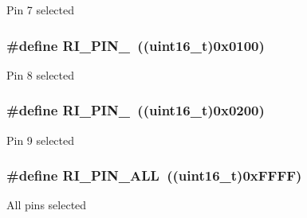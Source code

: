 Pin 7 selected \hypertarget{group___r_i___pin_gae80b308782b3bf8dc7c7ca756cd26493}{
\subsubsection[{R\-I\-\_\-\-P\-I\-N\-\_\-8}]{\setlength{\rightskip}{0pt plus 5cm}\#define R\-I\-\_\-\-P\-I\-N\-\_~((uint16\-\_\-t)0x0100)}}\label{group___r_i___pin_gae80b308782b3bf8dc7c7ca756cd26493}
Pin 8 selected \hypertarget{group___r_i___pin_ga1e3cdb6c6e8aa36f83e2bb38f41331f4}{
\subsubsection[{R\-I\-\_\-\-P\-I\-N\-\_\-9}]{\setlength{\rightskip}{0pt plus 5cm}\#define R\-I\-\_\-\-P\-I\-N\-\_~((uint16\-\_\-t)0x0200)}}\label{group___r_i___pin_ga1e3cdb6c6e8aa36f83e2bb38f41331f4}
Pin 9 selected \hypertarget{group___r_i___pin_ga45ed67020370018f1964e7686e9d7187}{
\subsubsection[{R\-I\-\_\-\-P\-I\-N\-\_\-\-A\-L\-L}]{\setlength{\rightskip}{0pt plus 5cm}\#define R\-I\-\_\-\-P\-I\-N\-\_\-\-A\-L\-L~((uint16\-\_\-t)0x\-F\-F\-F\-F)}}\label{group___r_i___pin_ga45ed67020370018f1964e7686e9d7187}
All pins selected 